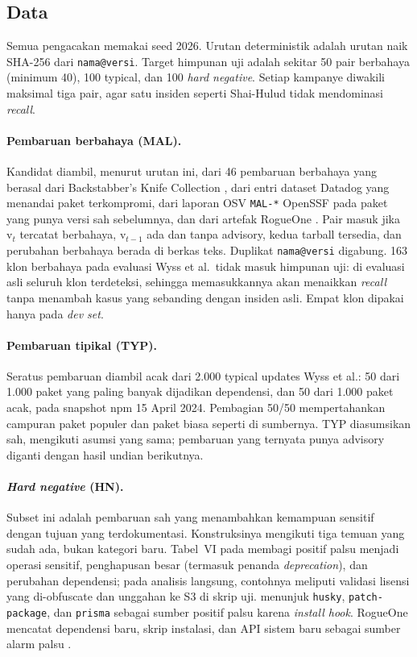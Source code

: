 \documentclass[a4paper,fleqn]{cas-dc}
\begin{document}
\subsection{Data}\label{sec:data}

Semua pengacakan memakai seed 2026. Urutan deterministik adalah urutan naik
SHA-256 dari \texttt{nama@versi}. Target himpunan uji adalah sekitar 50 pair
berbahaya (minimum 40), 100 typical, dan 100 \emph{hard negative}. Setiap
kampanye diwakili maksimal tiga pair, agar satu insiden seperti Shai-Hulud
tidak mendominasi \emph{recall}.

\paragraph{Pembaruan berbahaya (MAL).}
Kandidat diambil, menurut urutan ini, dari 46 pembaruan berbahaya
\citet{wyss2025evaluating} yang berasal dari Backstabber's Knife Collection
\citep{ohm2020backstabber}, dari entri dataset Datadog yang menandai paket
terkompromi, dari laporan OSV \texttt{MAL-*} OpenSSF pada paket yang punya
versi sah sebelumnya, dan dari artefak RogueOne \citep{sofaer2024rogueone}.
Pair masuk jika $\mathrm{v}_t$ tercatat berbahaya, $\mathrm{v}_{t-1}$ ada dan
tanpa advisory, kedua tarball tersedia, dan perubahan berbahaya berada di
berkas teks. Duplikat \texttt{nama@versi} digabung. 163 klon berbahaya pada evaluasi Wyss et al.\ tidak masuk himpunan uji: di
evaluasi asli seluruh klon terdeteksi, sehingga memasukkannya akan menaikkan
\emph{recall} tanpa menambah kasus yang sebanding dengan insiden asli. Empat
klon dipakai hanya pada \emph{dev set}.

\paragraph{Pembaruan tipikal (TYP).}
Seratus pembaruan diambil acak dari 2.000 typical updates Wyss et al.: 50 dari
1.000 paket yang paling banyak dijadikan dependensi, dan 50 dari 1.000 paket
acak, pada snapshot npm 15 April 2024. Pembagian 50/50 mempertahankan campuran
paket populer dan paket biasa seperti di sumbernya. TYP diasumsikan sah,
mengikuti asumsi yang sama; pembaruan yang ternyata punya advisory diganti
dengan hasil undian berikutnya.

\paragraph{\emph{Hard negative} (HN).}
Subset ini adalah pembaruan sah yang menambahkan kemampuan sensitif dengan
tujuan yang terdokumentasi. Konstruksinya mengikuti tiga temuan yang sudah ada,
bukan kategori baru. Tabel~VI pada \citet{wyss2025evaluating} membagi positif palsu menjadi
operasi sensitif, penghapusan besar (termasuk penanda \emph{deprecation}), dan
perubahan dependensi; pada analisis langsung, contohnya meliputi validasi
lisensi yang di-obfuscate dan unggahan ke S3 di skrip uji.
\citet{guo2026effective} menunjuk \texttt{husky}, \texttt{patch-package}, dan
\texttt{prisma} sebagai sumber positif palsu karena \emph{install hook}.
RogueOne mencatat dependensi baru, skrip instalasi, dan API sistem baru sebagai
sumber alarm palsu \citep{sofaer2024rogueone}.
\end{document}
